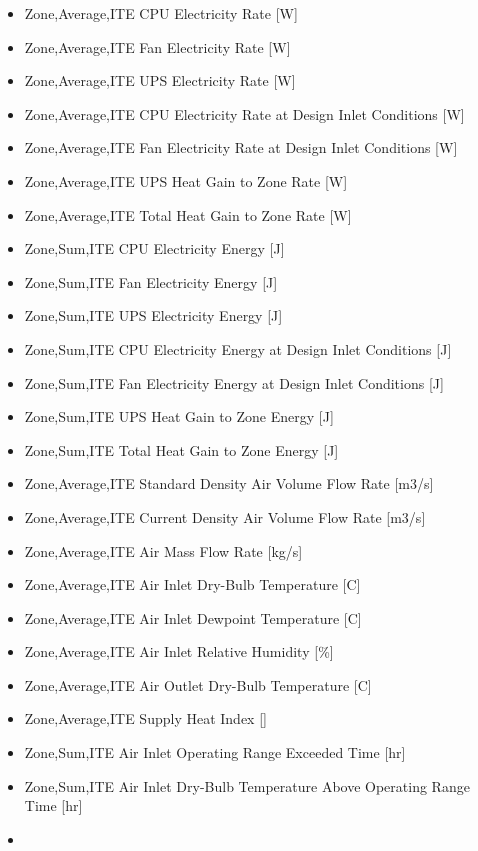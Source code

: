 \begin{itemize}
\tightlist
\item
  Zone,Average,ITE CPU Electricity Rate {[}W{]}
\item
  Zone,Average,ITE Fan Electricity Rate {[}W{]}
\item
  Zone,Average,ITE UPS Electricity Rate {[}W{]}
\item
  Zone,Average,ITE CPU Electricity Rate at Design Inlet Conditions {[}W{]}
\item
  Zone,Average,ITE Fan Electricity Rate at Design Inlet Conditions {[}W{]}
\item
  Zone,Average,ITE UPS Heat Gain to Zone Rate {[}W{]}
\item
  Zone,Average,ITE Total Heat Gain to Zone Rate {[}W{]}
\item
  Zone,Sum,ITE CPU Electricity Energy {[}J{]}
\item
  Zone,Sum,ITE Fan Electricity Energy {[}J{]}
\item
  Zone,Sum,ITE UPS Electricity Energy {[}J{]}
\item
  Zone,Sum,ITE CPU Electricity Energy at Design Inlet Conditions {[}J{]}
\item
  Zone,Sum,ITE Fan Electricity Energy at Design Inlet Conditions {[}J{]}
\item
  Zone,Sum,ITE UPS Heat Gain to Zone Energy {[}J{]}
\item
  Zone,Sum,ITE Total Heat Gain to Zone Energy {[}J{]}
\item
  Zone,Average,ITE Standard Density Air Volume Flow Rate {[}m3/s{]}
\item
  Zone,Average,ITE Current Density Air Volume Flow Rate {[}m3/s{]}
\item
  Zone,Average,ITE Air Mass Flow Rate {[}kg/s{]}
\item
  Zone,Average,ITE Air Inlet Dry-Bulb Temperature {[}C{]}
\item
  Zone,Average,ITE Air Inlet Dewpoint Temperature {[}C{]}
\item
  Zone,Average,ITE Air Inlet Relative Humidity {[}\%{]}
\item
  Zone,Average,ITE Air Outlet Dry-Bulb Temperature {[}C{]}
\item
  Zone,Average,ITE Supply Heat Index {[]}
\item
  Zone,Sum,ITE Air Inlet Operating Range Exceeded Time {[}hr{]}
\item
  Zone,Sum,ITE Air Inlet Dry-Bulb Temperature Above Operating Range Time {[}hr{]}
\item

\end{itemize}
